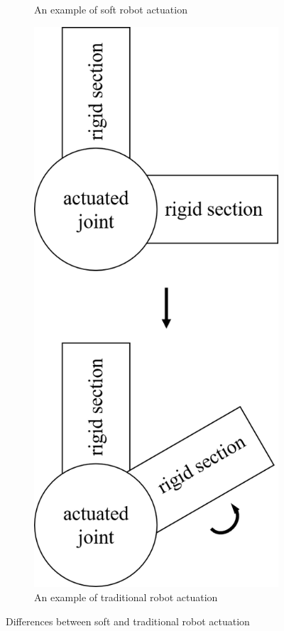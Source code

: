 \begin{figure}[ht]
\begin{subfigure}[c]{0.3\textwidth}
		\caption{An example of soft robot actuation}
	\end{subfigure}
	\hfill
	\begin{subfigure}[c]{0.3\textwidth}
		\centering
		\includegraphics[width=\textwidth]{TR_JA.png}
		\caption{An example of traditional robot actuation}
	\end{subfigure}
	\caption[Differences between robot actuation]{Differences between soft and traditional robot actuation}
	\label{fig:actdif}
\end{figure} 

